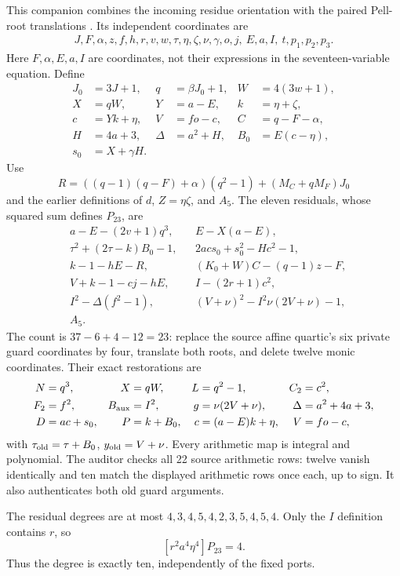 This companion combines the incoming residue orientation with the paired
Pell-root translations \cite{round11,budget}. Its independent coordinates are
\[
 \begin{gathered}
 J,F,\alpha,z,f,h,r,v,w,\tau,\eta,\zeta,\nu,\gamma,o,j,\ E,a,I,\ t,p_1,p_2,p_3.
 \end{gathered}
\]
Here $F,\alpha,E,a,I$ are coordinates, not their expressions in the
seventeen-variable equation. Define
\begin{align*}
 J_0&=3J+1,&q&=\beta J_0+1,&W&=4(3w+1),\\
 X&=qW,&Y&=a-E,&k&=\eta+\zeta,\\
 c&=Yk+\eta,&V&=fo-c,&C&=q-F-\alpha,\\
 H&=4a+3,&\Delta&=a^2+H,&B_0&=E(c-\eta),\\
 s_0&=X+\gamma H.&&&&
\end{align*}
Use
\[
 R=((q-1)(q-F)+\alpha)(q^2-1)+(M_C+qM_F)J_0
\]
and the earlier definitions of $d$, $Z=\eta\zeta$, and $A_5$.
The eleven residuals, whose squared sum defines $P_{23}$, are
\begin{align*}
 &a-E-(2v+1)q^3, && E-X(a-E),\\
 &\tau^2+(2\tau-k)B_0-1,&&2acs_0+s_0^2-Hc^2-1,\\
 &k-1-hE-R,&&(K_0+W)C-(q-1)z-F,\\
 &V+k-1-cj-hE,&&I-(2r+1)c^2,\\
 &I^2-\Delta(f^2-1),&&(V+\nu)^2-I^2\nu(2V+\nu)-1,\\
 &A_5.&&
\end{align*}
The count is $37-6+4-12=23$: replace the source affine quartic's six
private guard coordinates by four, translate both roots, and delete twelve
monic coordinates. Their exact restorations are
\begin{align*}
 N&=q^3,&X&=qW,&L&=q^2-1,&C_2&=c^2,\\
 F_2&=f^2,&B_{\rm aux}&=I^2,&g&=\nu(2V+\nu),&\Delta&=a^2+4a+3,\\
 D&=ac+s_0,&P&=k+B_0,&c&=(a-E)k+\eta,&V&=fo-c,
\end{align*}
with $\tau_{\rm old}=\tau+B_0$, $y_{\rm old}=V+\nu$.
Every arithmetic map is integral and polynomial. The auditor checks all
22 source arithmetic rows: twelve vanish identically and ten match the
displayed arithmetic rows once each, up to sign. It also authenticates
both old guard arguments.

The residual degrees are at most
$4,3,4,5,4,2,3,5,4,5,4$. Only the $I$ definition contains $r$, so
\[
 [r^2a^4\eta^4]P_{23}=4.
\]
Thus the degree is exactly ten, independently of the fixed ports.

